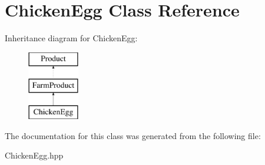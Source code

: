 \hypertarget{class_chicken_egg}{}\section{Chicken\+Egg Class Reference}
\label{class_chicken_egg}
Inheritance diagram for Chicken\+Egg\+:\begin{figure}[H]
\begin{center}
\leavevmode
\includegraphics[height=3.000000cm]{class_chicken_egg}
\end{center}
\end{figure}


The documentation for this class was generated from the following file\+:\begin{DoxyCompactItemize}
\item 
Chicken\+Egg.\+hpp\end{DoxyCompactItemize}
